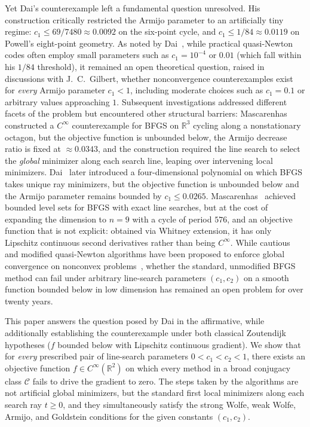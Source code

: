 \documentclass[11pt]{article}
\newcommand{\R}{\mathbb{R}}
\begin{document}
Yet Dai's counterexample left a fundamental question unresolved.
His construction critically restricted the Armijo parameter to an artificially tiny regime: $c_1 \le 69/7480 \approx 0.0092$ on the six-point cycle, and $c_1 \le 1/84 \approx 0.0119$ on Powell's eight-point geometry.
As noted by Dai~\cite{dai2002}, while practical quasi-Newton codes often employ small parameters such as $c_1 = 10^{-4}$ or $0.01$ (which fall within his $1/84$ threshold), it remained an open theoretical question, raised in discussions with J.~C.~Gilbert, whether nonconvergence counterexamples exist for \emph{every} Armijo parameter $c_1 < 1$, including moderate choices such as $c_1 = 0.1$ or arbitrary values approaching $1$.
Subsequent investigations addressed different facets of the problem but encountered other structural barriers:
Mascarenhas~\cite{mascarenhas2004} constructed a $C^\infty$ counterexample for BFGS on $\R^3$ cycling along a nonstationary octagon, but the objective function is unbounded below, the Armijo decrease ratio is fixed at $\approx 0.0343$, and the construction required the line search to select the \emph{global} minimizer along each search line, leaping over intervening local minimizers.
Dai~\cite{dai2013} later introduced a four-dimensional polynomial on which BFGS takes unique ray minimizers, but the objective function is unbounded below and the Armijo parameter remains bounded by $c_1 \le 0.0265$.
Mascarenhas~\cite{mascarenhas2014} achieved bounded level sets for BFGS with exact line searches, but at the cost of expanding the dimension to $n = 9$ with a cycle of period $576$, and an objective function that is not explicit: obtained via Whitney extension, it has only Lipschitz continuous second derivatives rather than being $C^\infty$.
While cautious and modified quasi-Newton algorithms have been proposed to enforce global convergence on nonconvex problems~\cite{li2001}, whether the standard, unmodified BFGS method can fail under arbitrary line-search parameters $(c_1, c_2)$ on a smooth function bounded below in low dimension has remained an open problem for over twenty years.

This paper answers the question posed by Dai in the affirmative, while additionally establishing the counterexample under both classical Zoutendijk hypotheses ($f$ bounded below with Lipschitz continuous gradient).
We show that for \emph{every} prescribed pair of line-search parameters $0 < c_1 < c_2 < 1$, there exists an objective function $f \in C^\infty(\R^2)$ on which every method in a broad conjugacy class $\mathcal{C}$ fails to drive the gradient to zero.
The steps taken by the algorithms are not artificial global minimizers, but the standard first local minimizers along each search ray $t \ge 0$, and they simultaneously satisfy the strong Wolfe, weak Wolfe, Armijo, and Goldstein conditions for the given constants $(c_1, c_2)$.
\end{document}
